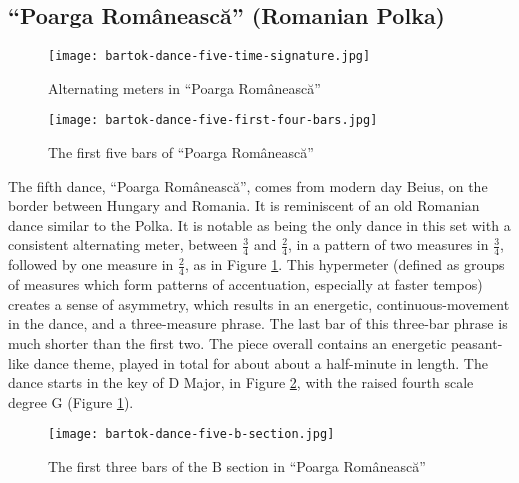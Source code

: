\subsection{``Poarga Românească'' (Romanian Polka)}

\begin{figure}
  \centering
  \texttt{[image: bartok-dance-five-time-signature.jpg]}
  \caption[The alternating meters in ``Poarga Românească'' of Bartok's \textit{Romanian Folk Dances, Sz. 56, BB 68}]{Alternating meters in ``Poarga Românească''}
  \label{fig:bartok-dance-five-time-signature}
\end{figure}

\begin{figure}
  \centering
  \texttt{[image: bartok-dance-five-first-four-bars.jpg]}
  \caption[The first five bars of ``Poarga Românească'', of Bartok's \textit{Romanian Folk Dances, Sz. 56, BB 68}]{The first five bars of ``Poarga Românească''}
  \label{fig:bartok-dance-five-first-four-bars}
\end{figure}


The fifth dance, ``Poarga Românească'', comes from modern day Beius, on the border between Hungary and Romania. It is reminiscent of an old Romanian dance similar to the Polka. It is notable as being the only dance in this set with a consistent alternating meter, between $\frac{3}{4}$ and $\frac{2}{4}$, in a pattern of two measures in $\frac{3}{4}$, followed by one measure in $\frac{2}{4}$, as in Figure \ref{fig:bartok-dance-five-time-signature}\autocite{Lung_2016}. This hypermeter (defined as groups of measures which form patterns of accentuation, especially at faster tempos\autocite{Hughes_Gotham_Hamm_2021}) creates a sense of asymmetry, which results in an energetic, continuous-movement in the dance, and a three-measure phrase. The last bar of this three-bar phrase is much shorter than the first two. The piece overall contains an energetic peasant-like dance theme, played in total for about about a half-minute in length. The dance starts in the key of D Major, in Figure \ref{fig:bartok-dance-five-first-four-bars}\autocite{Lung_2016}, with the raised fourth scale degree G\musSharp{} (Figure \ref{fig:bartok-dance-five-time-signature}\autocite{Lung_2016}).

\begin{figure}
  \centering
  \texttt{[image: bartok-dance-five-b-section.jpg]}
  \caption[The first three bars in the B section of ``Poarga Românească'' in Bartok's \textit{Romanian Folk Dances, Sz. 56, BB 68}]{The first three bars of the B section in ``Poarga Românească''}
  \label{fig:bartok-dance-five-b-section}
\end{figure}

